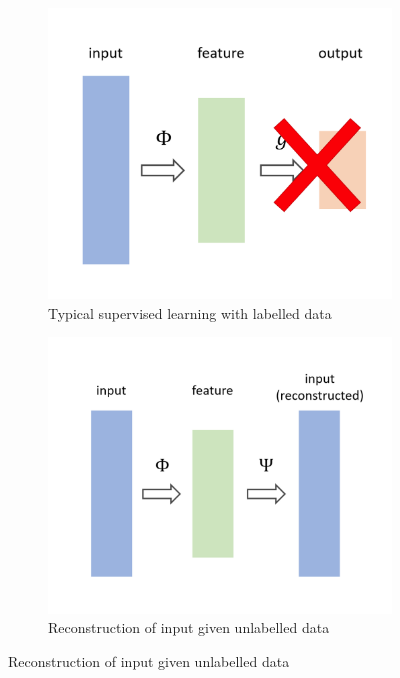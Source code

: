 \begin{figure}[H]
    \centering
    \begin{subfigure}[b]{0.30\textwidth}
        \includegraphics[width=\linewidth]{img/supervised_comparison.png}
        \caption{Typical supervised learning with labelled data}
    \end{subfigure}
    \begin{subfigure}[b]{0.30\textwidth}
        \includegraphics[width=\linewidth]{img/representation_learning.png}
        \caption{Reconstruction of input given unlabelled data}
    \end{subfigure}
\end{figure}

